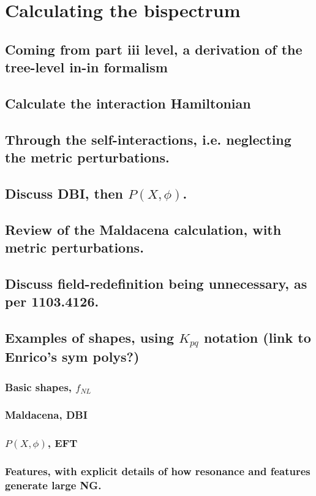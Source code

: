 \section{Calculating the bispectrum}
    \subsection{Coming from part iii level, a derivation of the tree-level in-in formalism}
    \subsection{Calculate the interaction Hamiltonian}
    \subsection{Through the self-interactions, i.e. neglecting the metric perturbations.}
    \subsection{Discuss DBI, then $P(X, \phi)$.}
    \subsection{Review of the Maldacena calculation, with metric perturbations.}
    \subsection{Discuss field-redefinition being unnecessary, as per 1103.4126.}
    \subsection{Examples of shapes, using $K_{pq}$ notation (link to Enrico's sym polys?)}
    \subsubsection{Basic shapes, $f_{NL}$}
    \subsubsection{Maldacena, DBI}
    \subsubsection{$P(X, \phi)$, EFT}
    \subsubsection{Features, with explicit details of how resonance and features generate large NG.}
